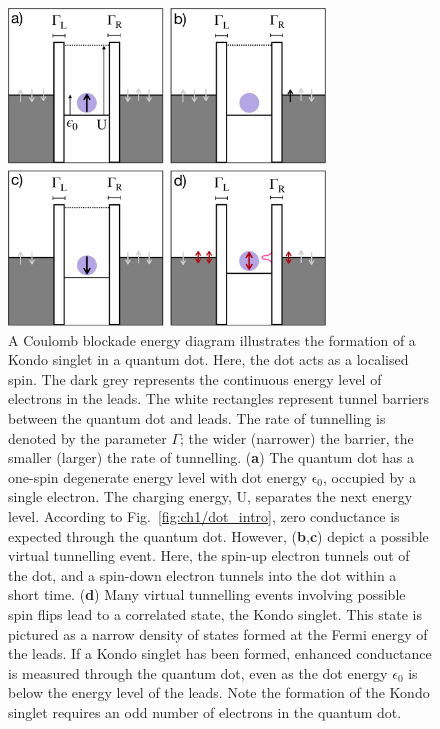 \begin{figure}[!hbt]
 \begin{center}
\includegraphics[width=0.75\textwidth]{figures/ch2/figure11.pdf}
\caption[Kondo Effect Illustration : Quantum Dot]{\label{fig:ch2/kondo_dot_diagram} 
A Coulomb blockade energy diagram illustrates the formation of a Kondo singlet in a quantum dot. Here, the dot acts as a localised spin. The dark grey represents the continuous energy level of electrons in the leads. The white rectangles represent tunnel barriers between the quantum dot and leads. The rate of tunnelling is denoted by the parameter $\Gamma$; the wider (narrower) the barrier, the smaller (larger) the rate of tunnelling. (\textbf{a}) The quantum dot has a one-spin degenerate energy level with dot energy $\mathrm{\epsilon_0}$, occupied by a single electron. The charging energy, $\mathrm{U}$, separates the next energy level. According to Fig.~\ref{fig:ch1/dot_intro}, zero conductance is expected through the quantum dot. However, (\textbf{b},\textbf{c}) depict a possible virtual tunnelling event. Here, the spin-up electron tunnels out of the dot, and a spin-down electron tunnels into the dot within a short time. (\textbf{d}) Many virtual tunnelling events involving possible spin flips lead to a correlated state, the Kondo singlet. This state is pictured as a narrow density of states formed at the Fermi energy of the leads. If a Kondo singlet has been formed, enhanced conductance is measured through the quantum dot, even as the dot energy $\epsilon_0$ is below the energy level of the leads. Note the formation of the Kondo singlet requires an odd number of electrons in the quantum dot.
 }
 \end{center}
\end{figure}


